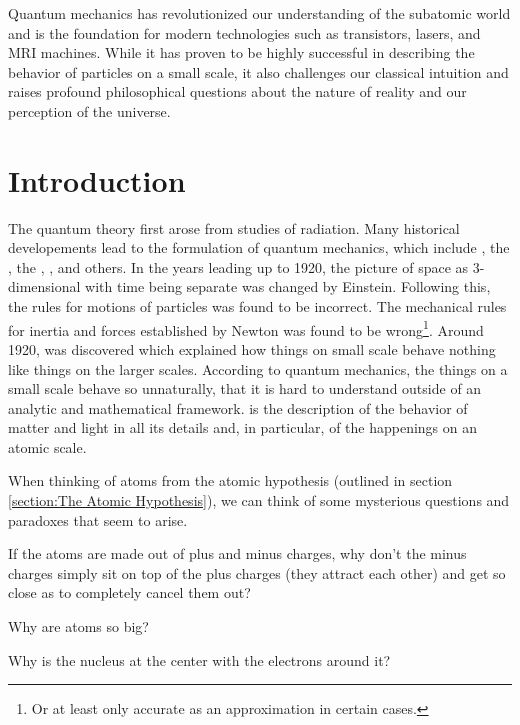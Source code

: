 Quantum mechanics has revolutionized our understanding of the subatomic world and is the foundation for modern technologies such as transistors, lasers, and MRI machines. While it has proven to be highly successful in describing the behavior of particles on a small scale, it also challenges our classical intuition and raises profound philosophical questions about the nature of reality and our perception of the universe.





\section{Introduction}

The quantum theory first arose from studies of radiation. Many historical developements lead to the formulation of quantum mechanics, which include , the , the , , and others. In the years leading up to 1920, the picture of space as 3-dimensional with time being separate was changed by Einstein. Following this, the rules for motions of particles was found to be incorrect. The mechanical rules for inertia and forces established by Newton was found to be wrong\footnote{Or at least only accurate as an approximation in certain cases.}. Around 1920,  was discovered which explained how things on small scale behave nothing like things on the larger scales. According to quantum mechanics, the things on a small scale behave so unnaturally, that it is hard to understand outside of an analytic and mathematical framework.  is the description of the behavior of matter and light in all its details and, in particular, of the happenings on an atomic scale. 

When thinking of atoms from the atomic hypothesis (outlined in section \ref{section:The Atomic Hypothesis}), we can think of some mysterious questions and paradoxes that seem to arise.

\begin{questions}
	\item If the atoms are made out of plus and minus charges, why don’t the minus charges simply sit on top of the plus charges (they attract each other) and get so close as to completely cancel them out? 
	\item Why are atoms so big? 
	\item Why is the nucleus at the center with the electrons around it?
\end{questions}

